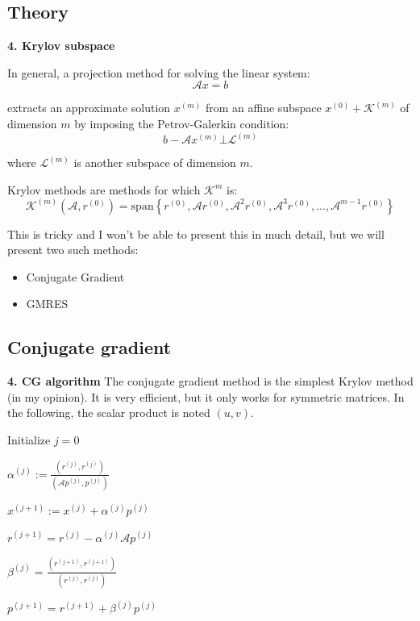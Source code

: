 \subsection{Theory}
\begin{frame}[fragile]{\textbf{4. Krylov subspace}}

In general, a projection method for solving the linear system:
\[
\mathcal{A}x = b
\]

extracts an approximate solution $x^{(m)}$ from an affine subspace $x^{(0)}+\mathcal{K}^{(m)}$ of dimension $m$ by imposing the Petrov-Galerkin condition:
\[
b - \mathcal{A}x^{(m)} \bot \mathcal{L}^{(m)}
\]


where $\mathcal{L}^{(m)}$ is another subspace of dimension $m$.


Krylov methods are methods for which $\mathcal{K}^m$ is:
\[
\mathcal{K}^{(m)} (\mathcal{A},r^{(0)}) = \mathrm{span} \left\{ r^{(0)}, \mathcal{A}r^{(0)}, \mathcal{A}^2r^{(0)}, \mathcal{A}^{3}r^{(0)}, ... , \mathcal{A}^{m-1}r^{(0)}\right\}
\]

This is tricky and I won't be able to present this in much detail, but we will present two such methods:
\begin{itemize}
	\item Conjugate Gradient
	\item GMRES
\end{itemize}
\end{frame}

\subsection{Conjugate gradient }


\begin{frame}[fragile]{\textbf{4. CG algorithm}}
The conjugate gradient method is the simplest Krylov method (in my opinion). It is very efficient, but it only works for symmetric matrices. In the following, the scalar product is noted $(u,v)$.

\vspace{0.5cm}


  \begin{algorithm}[H]

	Initialize $j=0$
	
	{
		$\alpha^{(j)} := \frac{(r^{(j)},r^{(j)})}{(\mathcal{A}p^{(j)},p^{(j)})} $
		
		$x^{(j+1)} := x^{(j)} + \alpha^{(j)}p^{(j)}$
		
		$r^{(j+1)} = r^{(j)} - \alpha^{(j)} \mathcal{A}p^{(j)}$
		
		$\beta^{(j)} = \frac{(r^{(j+1)},r^{(j+1)})}{(r^{(j)},r^{(j)})}$
		
		$p^{(j+1)} = r^{(j+1)} + \beta^{(j)} p^{(j)}$
		
	}
\end{algorithm}
\end{frame}


